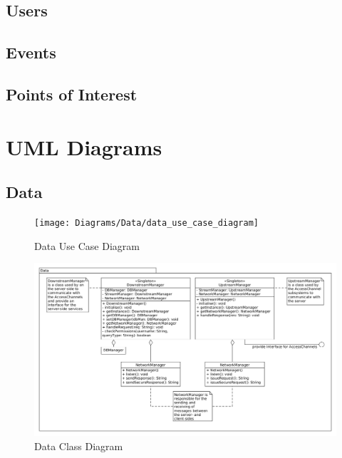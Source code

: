 \documentclass[11pt]{article}
\begin{document}
	\subsection{Users}
	\subsection{Events}
	\subsection{Points of Interest}
	
	\section{UML Diagrams}
	\subsection{Data}
	\begin{figure}[!h]
        \centering
        \texttt{[image: Diagrams/Data/data\_use\_case\_diagram]}
        \caption{Data Use Case Diagram}
        \label{fig:data_use_case}
    \end{figure}
    \begin{figure}[!h]
        \centering
        \includegraphics[width=\textwidth]{Diagrams/Data/data_class_diagram}
        \caption{Data Class Diagram}
        \label{fig:data_class}
    \end{figure}
\end{document}
